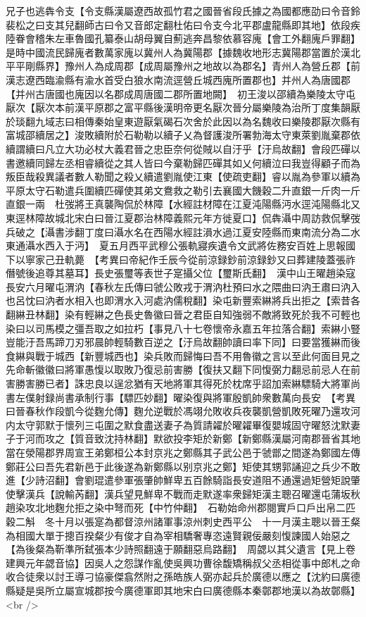 兄子也逃犇令支【令支縣漢屬遼西故孤竹君之國晉省段氏據之為國都應劭曰令音鈴裴松之曰支其兒翻師古曰令又音郎定翻杜佑曰令支今北平郡盧龍縣即其地】依段疾陸眷會稽朱左車魯國孔纂泰山胡母翼自薊逃奔昌黎依慕容廆【會工外翻廆戶罪翻】是時中國流民歸廆者數萬家廆以冀州人為冀陽郡【據魏收地形志冀陽郡當置於漢北平平剛縣界】豫州人為成周郡【成周屬豫州之地故以為郡名】青州人為營丘郡【前漢志遼西臨渝縣有渝水首受白狼水南流逕營丘城西廆所置郡也】并州人為唐國郡【并州古唐國也廆因以名郡成周唐國二郡所置地闕】　初王浚以邵續為樂陵太守屯厭次【厭次本前漢平原郡之富平縣後漢明帝更名厭次晉分屬樂陵為治所丁度集韻厭於琰翻九域志曰相傳秦始皇東遊厭氣碣石次舍於此因以為名魏收曰樂陵郡厭次縣有富城邵續居之】浚敗續附於石勒勒以續子乂為督護浚所署勃海太守東萊劉胤棄郡依續謂續曰凡立大功必杖大義君晉之忠臣奈何從賊以自汙乎【汙烏故翻】會段匹磾以書邀續同歸左丞相睿續從之其人皆曰今棄勒歸匹磾其如乂何續泣曰我豈得顧子而為叛臣哉殺異議者數人勒聞之殺乂續遣劉胤使江東【使疏吏翻】睿以胤為參軍以續為平原太守石勒遣兵圍續匹磾使其弟文鴦救之勒引去襄國大饑穀二升直銀一斤肉一斤直銀一兩　杜弢將王真襲陶侃於林障【水經註材障在江夏沌陽縣沔水逕沌陽縣北又東逕林障故城北宋白曰晉江夏郡治林障義熙元年方徙夏口】侃犇灄中周訪救侃擊弢兵破之【灄書涉翻丁度曰灄水名在西陽水經註溳水過江夏安陸縣而東南流分為二水東通灄水西入于沔】　夏五月西平武穆公張軌寢疾遺令文武將佐務安百姓上思報國下以寧家己丑軌薨　【考異曰帝紀作壬辰今從前涼録鈔前涼録鈔又曰葬建陵蓋張祚僭號後追尊其墓耳】長史張璽等表世子寔攝父位【璽斯氏翻】　漢中山王曜趙染寇長安六月曜屯渭汭【春秋左氏傳曰虢公敗戎于渭汭杜預曰水之隈曲曰汭王肅曰汭入也呂忱曰汭者水相入也即渭水入河處汭儒稅翻】染屯新豐索綝將兵出拒之【索昔各翻綝丑林翻】染有輕綝之色長史魯徽曰晉之君臣自知強弱不敵將致死於我不可輕也染曰以司馬模之彊吾取之如拉朽【事見八十七卷懷帝永嘉五年拉落合翻】索綝小豎豈能汙吾馬蹄刀刃邪晨帥輕騎數百逆之【汙烏故翻帥讀曰率下同】曰要當獲綝而後食綝與戰于城西【新豐城西也】染兵敗而歸悔曰吾不用魯徽之言以至此何面目見之先命斬徽徽曰將軍愚愎以取敗乃復忌前害勝【復扶又翻下同愎弼力翻忌前忌人在前害勝害勝已者】誅忠良以逞忿猶有天地將軍其得死於枕席乎詔加索綝驃騎大將軍尚書左僕射録尚書承制行事【驃匹妙翻】曜染復與將軍殷凱帥衆數萬向長安　【考異曰晉春秋作段凱今從麴允傳】麴允逆戰於馮翊允敗收兵夜襲凱營凱敗死曜乃還攻河内太守郭默于懷列三屯圍之默食盡送妻子為質請糴於曜糴畢復嬰城固守曜怒沈默妻子于河而攻之【質音致沈持林翻】默欲投李矩於新鄭【新鄭縣漢屬河南郡晉省其地當在滎陽郡界周宣王弟鄭桓公本封京兆之鄭縣其子武公邑于虢鄫之間遂為鄭國左傳鄭莊公曰吾先君新邑于此後遂為新鄭縣以别京兆之鄭】矩使其甥郭誦迎之兵少不敢進【少詩沼翻】會劉琨遣參軍張肇帥鮮卑五百餘騎詣長安道阻不通還過矩營矩說肇使擊漢兵【說輸芮翻】漢兵望見鮮卑不戰而走默遂率衆歸矩漢主聰召曜還屯蒲坂秋趙染攻北地麴允拒之染中弩而死【中竹仲翻】　石勒始命州郡閱實戶口戶出帛二匹穀二斛　冬十月以張寔為都督涼州諸軍事涼州刺史西平公　十一月漢主聰以晉王粲為相國大單于摠百揆粲少有俊才自為宰相驕奢專恣遠賢親佞嚴刻愎諫國人始惡之【為後粲為靳準所弑張本少詩照翻遠于願翻惡烏路翻】　周勰以其父遺言【見上卷建興元年勰音協】因吳人之怨謀作亂使吳興功曹徐馥矯稱叔父丞相從事中郎札之命收合徒衆以討王導刁協豪傑翕然附之孫皓族人弼亦起兵於廣德以應之【沈約曰廣德縣疑是吳所立屬宣城郡按今廣德軍即其地宋白曰廣德縣本秦鄣郡地漢以為故鄣縣】<br />
